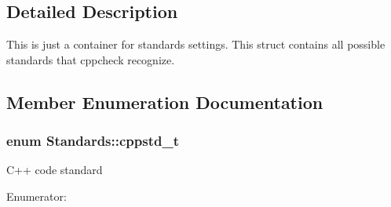 \subsection{Detailed Description}
This is just a container for standards settings. This struct contains all possible standards that cppcheck recognize. 

\subsection{Member Enumeration Documentation}
\hypertarget{struct_standards_ad2ffa779504d6f6b30e185d6853991c7}{
\subsubsection[{cppstd\-\_\-t}]{\setlength{\rightskip}{0pt plus 5cm}enum {\bf Standards\-::cppstd\-\_\-t}}}\label{struct_standards_ad2ffa779504d6f6b30e185d6853991c7}
C++ code standard \begin{Desc}
\item[Enumerator\-: ]\par
\begin{description}
\item[{\em 
\hypertarget{struct_standards_ad2ffa779504d6f6b30e185d6853991c7abf9a0c26dc4eb9594642765f6358bbd5}{C\-P\-P03}\label{struct_standards_ad2ffa779504d6f6b30e185d6853991c7abf9a0c26dc4eb9594642765f6358bbd5}
}]\item[{\em 
\hypertarget{struct_standards_ad2ffa779504d6f6b30e185d6853991c7ae2869e6757f9e93393948063f4fa059f}{C\-P\-P11}\label{struct_standards_ad2ffa779504d6f6b30e185d6853991c7ae2869e6757f9e93393948063f4fa059f}
}]\end{description}
\end{Desc}

